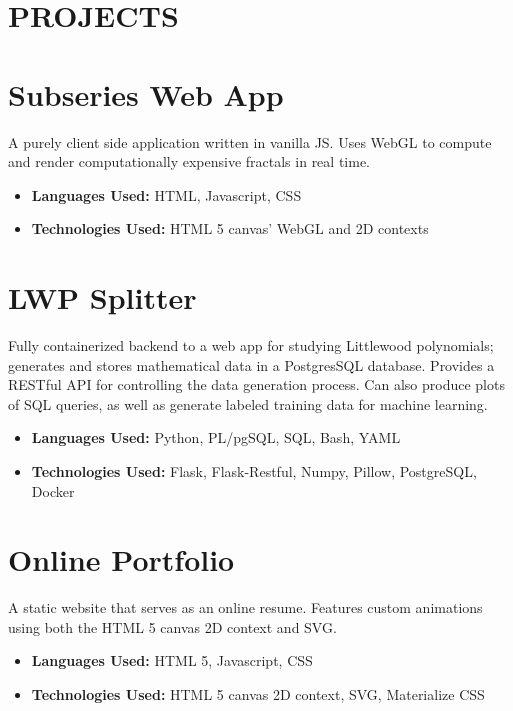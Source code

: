 \documentclass[margin]{../res}
\begin{document}
  

\address{Email: raphaelreyna@protonmail.com \\
  Phone: (626) 384-1342\\
  Site: www.raphaelreyna.works}
                           
                        
\begin{resume} 
\section{PROJECTS}
  
\normalsize{\section{Subseries Web App}}
A purely client side application written in vanilla JS.
Uses WebGL to compute and render computationally expensive fractals in real time.
\begin{itemize}
\item {\bf Languages Used: } HTML, Javascript, CSS
\item {\bf Technologies Used: } HTML 5 canvas' WebGL and 2D contexts
\end{itemize}

\normalsize{\section{LWP Splitter}}
Fully containerized backend to a web app for studying Littlewood polynomials;
generates and stores mathematical data in a PostgresSQL database.
Provides a RESTful API for controlling the data generation process.
Can also produce plots of SQL queries, as well as generate labeled training data for
machine learning.
\begin{itemize}
\item{ \bf Languages Used: } Python, PL/pgSQL, SQL, Bash, YAML
\item { \bf Technologies Used: } Flask, Flask-Restful, Numpy, Pillow, PostgreSQL, Docker
\end{itemize}

\normalsize{\section{Online Portfolio}}
A static website that serves as an online resume.
Features custom animations using both the HTML 5 canvas 2D context and SVG.
\begin{itemize}
\item{ \bf Languages Used: } HTML 5, Javascript, CSS
\item{ \bf Technologies Used: } HTML 5 canvas 2D context, SVG, Materialize CSS
\end{itemize}


\end{resume}
\end{document}
